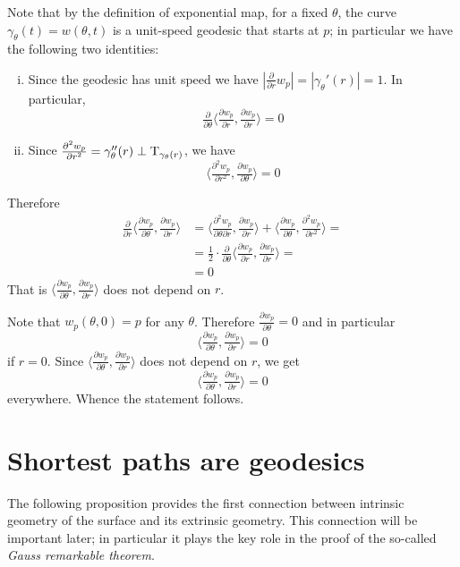 Note that by the definition of exponential map, for a fixed $\theta$, the curve $\gamma_\theta(t)=w(\theta,t)$ is a unit-speed geodesic that starts at $p$;
in particular we have the following two identities:
\begin{enumerate}[(i)]
\item Since the geodesic has unit speed we have $|\tfrac{\partial}{\partial r}w_p|=|\gamma_\theta'(r)|=1$. In particular,
 \[\tfrac{\partial}{\partial \theta}\langle\tfrac{\partial w_p}{\partial r},\tfrac{\partial w_p}{\partial r}\rangle=0\]
\item Since $\tfrac{\partial^2w_p}{\partial r^2}=\gamma''_\theta(r)\perp\mathrm{T}_{\gamma_\theta(r)}$, we have 
\[\langle\tfrac{\partial^2w_p}{\partial r^2},\tfrac{\partial w_p}{\partial \theta}\rangle=0\]
\end{enumerate}
Therefore
\begin{align*}
\tfrac{\partial}{\partial r}
\langle\tfrac{\partial w_p}{\partial\theta},\tfrac{\partial w_p}{\partial r}\rangle
&=\langle\tfrac{\partial^2 w_p}{\partial\theta\partial r},\tfrac{\partial w_p}{\partial r}\rangle
+
\langle\tfrac{\partial w_p}{\partial\theta},\tfrac{\partial^2 w_p}{\partial r^2}\rangle=
\\
&=\tfrac12\cdot \tfrac{\partial}{\partial \theta}\langle\tfrac{\partial w_p}{\partial r},\tfrac{\partial w_p}{\partial r}\rangle=
\\
&=0
\end{align*}
That is $\langle\tfrac{\partial w_p}{\partial\theta},\tfrac{\partial w_p}{\partial r}\rangle$ does not depend on $r$.

Note that $w_p(\theta,0)=p$ for any $\theta$.
Therefore
$\tfrac{\partial w_p}{\partial\theta}=0$
and in particular 
\[\langle\tfrac{\partial w_p}{\partial\theta},\tfrac{\partial w_p}{\partial r}\rangle=0\]
if $r=0$.
Since $\langle\tfrac{\partial w_p}{\partial\theta},\tfrac{\partial w_p}{\partial r}\rangle$ does not depend on $r$, 
we get 
\[\langle\tfrac{\partial w_p}{\partial\theta},\tfrac{\partial w_p}{\partial r}\rangle=0\]
everywhere.
Whence the statement follows.
\qeds

\section*{Shortest paths are geodesics}

The following proposition provides the first connection between intrinsic geometry of the surface and its extrinsic geometry.
This connection will be important later; in particular it plays the key role in the proof of the so-called \emph{Gauss remarkable theorem}.

